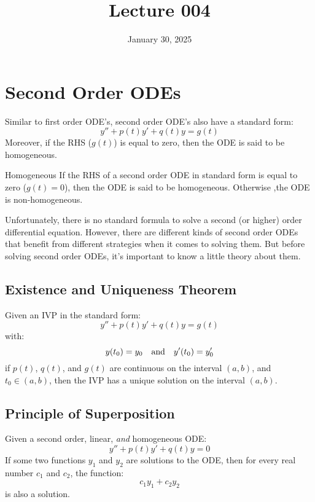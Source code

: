 \documentclass[12pt]{article}
\title{Lecture 004}
\date{January 30, 2025}
\begin{document}
\newpage
\section{Second Order ODEs}
\label{sec:secondOrderODEs}

Similar to first order ODE's, second order ODE's also have a standard form:
\begin{equation*}
  y'' + p(t)y' + q(t)y = g(t)
\end{equation*}
Moreover, if the RHS ($g(t)$) is equal to zero, then the ODE is said to be homogeneous.
\begin{definition}{Homogeneous}
  If the RHS of a second order ODE in standard form is equal to zero ($g(t) = 0$), then the  ODE is said to be homogeneous. Otherwise ,the ODE is non-homogeneous.
\end{definition}

Unfortunately, there is no standard formula to solve a second (or higher) order differential equation. However, there are different kinds of second order ODEs that benefit from different strategies when it comes to solving them. But before solving second order ODEs, it's important to know a little theory about them.

\subsection{Existence and Uniqueness Theorem}
\label{ssec:existenceAndUniquenessTheorem}

Given an IVP in the standard form:
\begin{equation*}
  y'' + p(t)y' + q(t)y = g(t)
\end{equation*}
with:
\begin{equation*}
  y(t_0) = y_0\ \ \ \textup{and}\ \ \ y'(t_0) = y'_0
\end{equation*}
if $p(t)$, $q(t)$, and $g(t)$ are continuous on the interval $(a,b)$, and $t_0 \in (a,b)$, then the IVP has a unique solution on the interval $(a,b)$.

\subsection{Principle of Superposition}
\label{ssec:principleOfSuperposition}

Given a second order, linear, \textit{and} homogeneous ODE:
\begin{equation*}
  y'' + p(t)y' + q(t)y = 0
\end{equation*}
If some two functions $y_1$ and $y_2$ are solutions to the ODE, then for every real number $c_1$ and $c_2$, the function:
\begin{equation*}
  c_1y_1 + c_2y_2
\end{equation*}
is also a solution.
\end{document}
